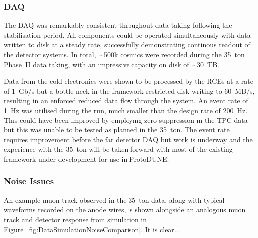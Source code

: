 \subsubsection{DAQ}\label{sec:35tonPhaseIIOutcomesDAQ}

The DAQ was remarkably consistent throughout data taking following the stabilisation period.  All components could be operated simultaneously with data written to disk at a steady rate, successfully demonstrating continous readout of the detector systems.  In total, $\sim$500k cosmics were recorded during the 35~ton Phase~II data taking, with an impressive capacity on disk of $\sim$30~TB.

Data from the cold electronics were shown to be processed by the RCEs at a rate of 1~Gb/s but a bottle-neck in the framework restricted disk writing to 60~MB/s, resulting in an enforced reduced data flow through the system.  An event rate of 1~Hz was utilised during the run, much smaller than the design rate of 200~Hz.  This could have been improved by employing zero suppression in the TPC data but this was unable to be tested as planned in the 35~ton.  The event rate requires improvement before the far detector DAQ but work is underway and the experience with the 35~ton will be taken forward with most of the existing framework under development for use in ProtoDUNE.

\subsubsection{Noise Issues}\label{sec:35tonPhaseIIOutcomesNoise}

An example muon track observed in the 35~ton data, along with typical waveforms recorded on the anode wires, is shown alongside an analogous muon track and detector response from simulation in Figure~\ref{fig:DataSimulationNoiseComparison}.  It is clear...

